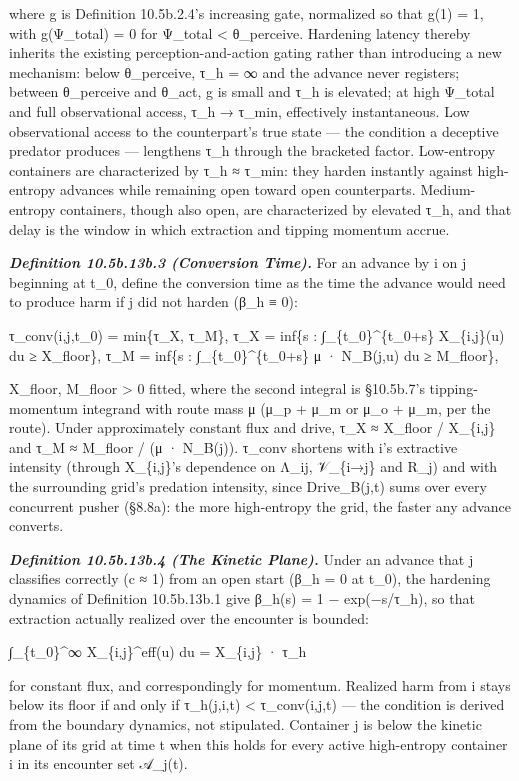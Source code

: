 \documentclass[
]{article}
\begin{document}
where g is Definition 10.5b.2.4's increasing gate, normalized so that
g(1) = 1, with g(Ψ\_total) = 0 for Ψ\_total \textless{} θ\_perceive.
Hardening latency thereby inherits the existing perception-and-action
gating rather than introducing a new mechanism: below θ\_perceive, τ\_h
= ∞ and the advance never registers; between θ\_perceive and θ\_act, g
is small and τ\_h is elevated; at high Ψ\_total and full observational
access, τ\_h → τ\_min, effectively instantaneous. Low observational
access to the counterpart's true state --- the condition a deceptive
predator produces --- lengthens τ\_h through the bracketed factor.
Low-entropy containers are characterized by τ\_h ≈ τ\_min: they harden
instantly against high-entropy advances while remaining open toward open
counterparts. Medium-entropy containers, though also open, are
characterized by elevated τ\_h, and that delay is the window in which
extraction and tipping momentum accrue.

\emph{\textbf{Definition 10.5b.13b.3 (Conversion Time).}} For an advance
by i on j beginning at t\_0, define the conversion time as the time the
advance would need to produce harm if j did not harden (β\_h ≡ 0):

τ\_conv(i,j,t\_0) = min\{τ\_X, τ\_M\}, τ\_X = inf\{s :
∫\_\{t\_0\}\^{}\{t\_0+s\} X\_\{i,j\}(u) du ≥ X\_floor\}, τ\_M = inf\{s :
∫\_\{t\_0\}\^{}\{t\_0+s\} μ · N\_B(j,u) du ≥ M\_floor\},

X\_floor, M\_floor \textgreater{} 0 fitted, where the second integral is
§10.5b.7's tipping-momentum integrand with route mass μ (μ\_p + μ\_m or
μ\_o + μ\_m, per the route). Under approximately constant flux and
drive, τ\_X ≈ X\_floor / X\_\{i,j\} and τ\_M ≈ M\_floor / (μ · N\_B(j)).
τ\_conv shortens with i's extractive intensity (through X\_\{i,j\}'s
dependence on Λ\_ij, 𝒱\_\{i→j\} and R\_j) and with the surrounding
grid's predation intensity, since Drive\_B(j,t) sums over every
concurrent pusher (§8.8a): the more high-entropy the grid, the faster
any advance converts.

\emph{\textbf{Definition 10.5b.13b.4 (The Kinetic Plane).}} Under an
advance that j classifies correctly (c ≈ 1) from an open start (β\_h = 0
at t\_0), the hardening dynamics of Definition 10.5b.13b.1 give β\_h(s)
= 1 − exp(−s/τ\_h), so that extraction actually realized over the
encounter is bounded:

∫\_\{t\_0\}\^{}∞ X\_\{i,j\}\^{}eff(u) du = X\_\{i,j\} · τ\_h

for constant flux, and correspondingly for momentum. Realized harm from
i stays below its floor if and only if τ\_h(j,i,t) \textless{}
τ\_conv(i,j,t) --- the condition is derived from the boundary dynamics,
not stipulated. Container j is below the kinetic plane of its grid at
time t when this holds for every active high-entropy container i in its
encounter set 𝒜\_j(t).
\end{document}
